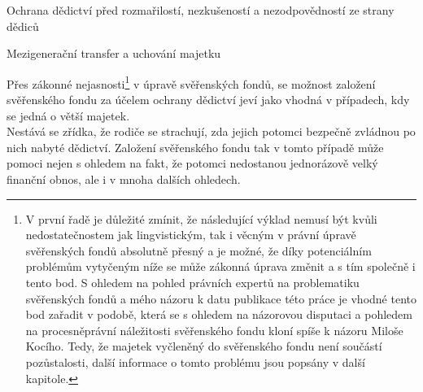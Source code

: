 \documentclass{article}
\begin{document}
 
 
 
 
 
 \begin{enumerate}
 {\Large\item Ochrana dědictví před rozmařilostí, nezkušeností a nezodpovědností ze strany dědiců}
 \item[1.] Mezigenerační transfer a uchování majetku
 \end{enumerate}
 
 Přes zákonné nejasnosti\footnote{ V první řadě je důležité zmínit, že následující výklad nemusí být kvůli nedostatečnostem jak lingvistickým, tak i věcným v právní úpravě svěřenských fondů absolutně přesný a je možné, že díky potenciálním problémům vytyčeným níže se může zákonná úprava změnit a s tím společně i tento bod. S ohledem na pohled právních expertů na problematiku svěřenských fondů a mého názoru k datu publikace této práce je vhodné tento bod zařadit v podobě, která se s ohledem na názorovou disputaci a pohledem na procesněprávní náležitosti svěřenského fondu kloní spíše k názoru Miloše Kocího. Tedy, že majetek vyčleněný do svěřenského fondu není součástí pozůstalosti, další informace o tomto problému jsou popsány v další kapitole.} v úpravě svěřenských fondů, se možnost založení svěřenského fondu za účelem ochrany dědictví jeví jako vhodná v případech, kdy se jedná o větší majetek.\\
 
 Nestává se zřídka, že rodiče se strachují, zda jejich potomci bezpečně zvládnou po nich nabyté dědictví. Založení svěřenského fondu tak v tomto případě může pomoci nejen s ohledem na fakt, že potomci nedostanou jednorázově velký finanční obnos, ale i v mnoha dalších ohledech.\\
 
\end{document}

